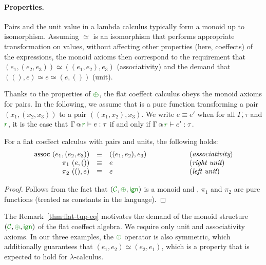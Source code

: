 \paragraph{Properties.}
Pairs and the unit value in a lambda calculus typically form a monoid up to isomorphism. Assuming 
$\simeq$ is an isomorphism that performs appropriate transformation on values, without affecting other
properties (here, coeffects) of the expressions, the monoid axioms then correspond to
the requirement that $(e_1, (e_2, e_3)) \simeq ((e_1, e_2), e_3)$ (associativity) and the
demand that $((), e) \simeq e \simeq (e, ())$ (unit).

Thanks to the properties of $\cpar$, the flat coeffect calculus obeys the monoid axioms for pairs.
In the following, we assume that  is a pure function transforming a pair $(x_1, (x_2, x_3))$
to a pair $((x_1, x_2), x_3)$. We write $e \equiv e'$ when for all $\Gamma, \tau$ and $\cclrd{r}$,
it is the case that $\coctx{\Gamma}{\cclrd{r}} \vdash e : \tau$ if and only if
$\coctx{\Gamma}{\cclrd{r}} \vdash e' : \tau$.

\begin{remark}
\label{thm:flat-tup-eq}
For a flat coeffect calculus with pairs and units, the following holds:
%
\begin{equation*}
\begin{array}{rclcl}
 \textnormal{\sffamily assoc}~(e_1, (e_2, e_3)) &\equiv& ((e_1, e_2), e_3) &\qquad\qquad&(\emph{associativity}) \\
 \pi_1~(e, ()) &\equiv& e &&(\emph{right unit})\\
 \pi_2~((), e) &\equiv& e &&(\emph{left unit})\\
\end{array}
\end{equation*}
\end{remark}
\begin{proof}
Follows from the fact that $(\C, \cpar, \czero)$ is a monoid and , $\pi_1$ and
$\pi_2$ are pure functions (treated as constants in the language).
\end{proof}

\noindent
The Remark~\ref{thm:flat-tup-eq} motivates the demand of the monoid structure
$(\C, \cpar, \czero)$ of the flat coeffect algebra. We require only unit and associativity
axioms. In our three examples, the $\cpar$ operator is also symmetric, which additionally
guarantees that $(e_1, e_2) \simeq (e_2, e_1)$, which is a property that is expected to hold
for $\lambda$-calculus.



